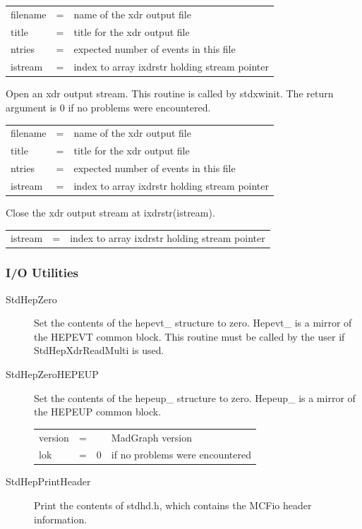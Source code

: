 \begin{description}
\begin{tabular}{lcl}
filename & = & name of the xdr output file \\
title & = & title for the xdr output file \\
ntries & = & expected number of events in this file \\
istream & = & index to array ixdrstr holding stream pointer \\
\end{tabular}

\item[int StdHepXdrWriteOpen(filename,title,ntries,istream)]
 Open an xdr output stream.
 This routine is called by stdxwinit.
 The return argument is 0 if no problems were encountered.

\begin{tabular}{lcl}
filename & = & name of the xdr output file \\
title & = & title for the xdr output file \\
ntries & = & expected number of events in this file \\
istream & = & index to array ixdrstr holding stream pointer \\
\end{tabular}

\item[StdHepXdrEnd(istream)]
 Close the xdr output stream at ixdrstr(istream).

\begin{tabular}{lcl}
istream & = & index to array ixdrstr holding stream pointer \\
\end{tabular}

\end{description}

\subsubsection{I/O Utilities}

\begin{description}

\item[StdHepZero]
 Set the contents of the hepevt\_ structure to zero.
 Hepevt\_ is a mirror of the HEPEVT common block.
 This routine must be called by the user if StdHepXdrReadMulti is used.

\item[StdHepZeroHEPEUP]
 Set the contents of the hepeup\_ structure to zero.
 Hepeup\_ is a mirror of the HEPEUP common block.

\begin{tabular}{lcll}
version & = &  & MadGraph version \\
lok  & = & 0  & if no problems were encountered \\
\end{tabular}

\item[StdHepPrintHeader]
 Print the contents of stdhd.h, which contains the MCFio header information.

\end{description}




